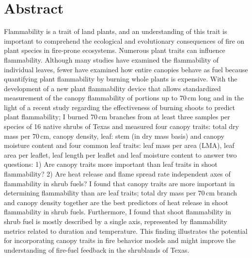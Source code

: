 \documentclass{ttuthes2007}
\begin{document}
\chapter{\textbf{Abstract}}
\noindent Flammability is a trait of land plants, and an understanding of this trait is important to comprehend the ecological and evolutionary consequences of fire on plant species in fire-prone ecosystems. Numerous plant traits can influence flammability. Although many studies have examined the flammability of individual leaves, fewer have examined how entire canopies behave as fuel because quantifying plant flammability by burning whole plants is expensive. With the development of a new plant flammability device that allows standardized measurement of the canopy flammability of portions up to 70\,cm long and in the light of a recent study regarding the effectiveness of burning shoots to predict plant flammability; I burned 70\,cm branches from at least three samples per species of 16 native shrubs of Texas and measured four canopy traits: total dry mass per 70\,cm, canopy density, leaf: stem (in dry mass basis) and canopy moisture content and four common leaf traits: leaf mass per area (LMA), leaf area per leaflet, leaf length per leaflet and leaf moisture content to answer two questions: 1) Are canopy traits more important than leaf traits in shoot flammability? 2) Are heat release and flame spread rate independent axes of flammability in shrub fuels? I found that canopy traits are more important in determining flammability than are leaf traits; total dry mass per 70\,cm branch and canopy density together are the best predictors of heat release in shoot flammability in shrub fuels. Furthermore, I found that shoot flammability in shrub fuel is mostly described by a single axis, represented by flammability metrics related to duration and temperature. This finding illustrates the potential for incorporating canopy traits in fire behavior models and might improve the understanding of fire-fuel feedback in the shrublands of Texas.


\listoftables
\listoffigures

\mainmatter

\end{document}
